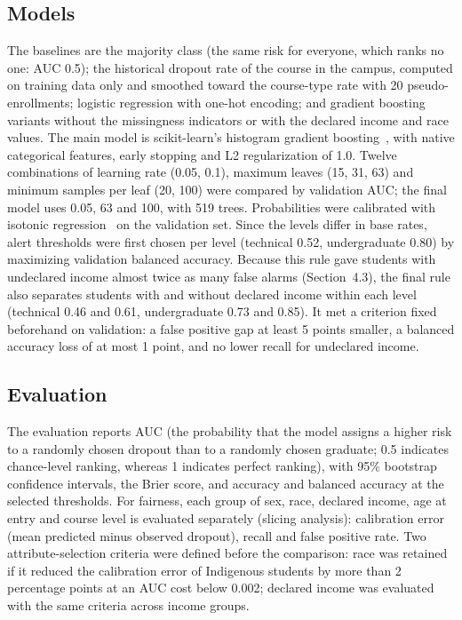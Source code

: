 \documentclass[12pt]{article}
\begin{document}
\subsection{Models}

The baselines are the majority class (the same risk for everyone, which ranks no one: AUC 0.5); the historical dropout rate of the course in the campus, computed on training data only and smoothed toward the
course-type rate with 20 pseudo-enrollments; logistic regression with
one-hot encoding; and gradient boosting variants without the missingness indicators or with the declared income and
race values. The main model is scikit-learn's histogram gradient boosting~\cite{pedregosa2011}, with native categorical features, early stopping and L2 regularization of 1.0.
Twelve combinations of learning rate (0.05, 0.1), maximum leaves (15, 31, 63) and minimum samples per leaf (20, 100)
were compared by validation AUC; the final model uses 0.05, 63 and 100, with 519 trees. Probabilities were
calibrated with isotonic regression~\cite{zadrozny2002} on the validation set. Since the levels differ in base rates, alert thresholds were first chosen per level (technical 0.52, undergraduate 0.80) by maximizing validation balanced accuracy. Because this rule gave students with undeclared income almost twice as many false alarms (Section~4.3), the final rule also separates students with and without declared income within each level (technical 0.46 and 0.61, undergraduate 0.73 and 0.85). It met a criterion fixed beforehand on validation: a false positive gap at least 5 points smaller, a balanced accuracy loss of at most 1 point, and no lower recall for undeclared income.

\subsection{Evaluation}

The evaluation reports AUC (the probability that the model assigns a higher risk to a randomly chosen dropout
than to a randomly chosen graduate; 0.5 indicates chance-level ranking, whereas 1 indicates perfect ranking), with 95\% bootstrap
confidence intervals, the Brier score, and accuracy and balanced accuracy at the selected thresholds. For fairness, each group of sex, race, declared income, age at entry and course level is evaluated
separately (slicing analysis): calibration error (mean predicted minus observed dropout),
recall and false positive rate. Two attribute-selection criteria were defined before the comparison: race was retained if it
reduced the calibration error of Indigenous students by more than 2 percentage points at an AUC cost below 0.002;
declared income was evaluated with the same criteria across income groups.
\end{document}
